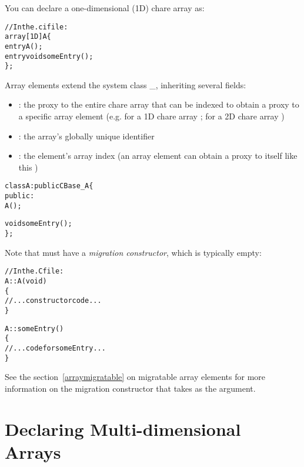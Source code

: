 You can declare a one-dimensional (1D) chare
array as:
%
\begin{alltt}
//In the .ci file:
array [1D] A \{
  entry A();
  entry void someEntry();
\};
\end{alltt}
%
Array elements extend the system class \_, inheriting
several fields:
%
\begin{itemize}
\item {}: the proxy to the entire chare array that can be indexed
  to obtain a proxy to a specific array element (e.g. for a 1D chare array
  ; for a 2D chare array )
\item {}: the array's globally unique identifier
\item {}: the element's array index (an array element can obtain a
  proxy to itself like this )
\end{itemize}
%
%
\begin{alltt}
class A : public CBase\_A \{
  public:
    A();

    void someEntry();
\};
\end{alltt}
%
Note that  must have a \emph{migration constructor}, which is typically
empty:
%
\begin{alltt}
//In the .C file:
A::A(void)
\{
  //... constructor code ...
\}

A::someEntry()
\{
  // ... code for someEntry ...
\}
\end{alltt}
%
See the section~\ref{arraymigratable} on migratable array elements for more
information on the migration constructor that takes  as
the argument.

\section{Declaring Multi-dimensional Arrays}

